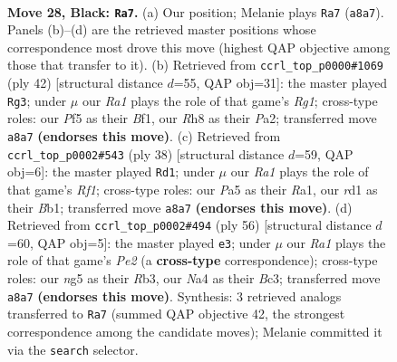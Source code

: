 \documentclass[11pt]{article}
\begin{document}
\begin{figure}[p]\centering
\begin{subfigure}{0.46\textwidth}\centering
\resizebox{\linewidth}{!}{%
\newchessgame
\chessboard[
  setfen={r1b4r/6k1/p1n1P1p1/p4pNp/n1B2B2/P5P1/1P3P1P/RK1R4 b - - 0 28},
  showmover=false,
  pgfstyle=straightmove, color=movearrow, markmove={a8-a7}
]}
\caption{}
\end{subfigure}\hfill
\begin{subfigure}{0.46\textwidth}\centering
\resizebox{\linewidth}{!}{%
\newchessgame
\chessboard[
  setfen={r3r1k1/1p1n1p1p/p1b3p1/8/2P2RP1/5P2/PPN4P/2K2BR1 w - - 1 22},
  showmover=false,
  pgfstyle=straightmove, color=movearrow, markmove={g1-g3}
]}
\caption{}
\end{subfigure}
\\[4pt]
\begin{subfigure}{0.46\textwidth}\centering
\resizebox{\linewidth}{!}{%
\newchessgame
\chessboard[
  setfen={r5k1/pbpp2pp/np2p3/7P/P1PP2r1/6N1/1P3PP1/RB3RK1 w - - 0 20},
  showmover=false,
  pgfstyle=straightmove, color=movearrow, markmove={f1-d1}
]}
\caption{}
\end{subfigure}\hfill
\begin{subfigure}{0.46\textwidth}\centering
\resizebox{\linewidth}{!}{%
\newchessgame
\chessboard[
  setfen={3r1bk1/5p2/pp2r1p1/2p4p/PnN5/1RB3P1/1P2PP1P/1R3K2 w - - 0 29},
  showmover=false,
  pgfstyle=straightmove, color=movearrow, markmove={e2-e3}
]}
\caption{}
\end{subfigure}
\caption{\textbf{Move 28, Black: \texttt{Ra7}.} (a) Our position; Melanie plays \texttt{Ra7} (\texttt{a8a7}). Panels (b)--(d) are the retrieved master positions whose correspondence most drove this move (highest QAP objective among those that transfer to it). (b) Retrieved from \texttt{ccrl\_top\_p0000\#1069} (ply 42) [structural distance $d$=55, QAP obj=31]: the master played \texttt{Rg3}; under $\mu$ our \emph{Ra1} plays the role of that game's \emph{Rg1}; cross-type roles: our \emph{P}f5 as their \emph{B}f1, our \emph{R}h8 as their \emph{P}a2; transferred move \texttt{a8a7} \textbf{(endorses this move)}. (c) Retrieved from \texttt{ccrl\_top\_p0002\#543} (ply 38) [structural distance $d$=59, QAP obj=6]: the master played \texttt{Rd1}; under $\mu$ our \emph{Ra1} plays the role of that game's \emph{Rf1}; cross-type roles: our \emph{P}a5 as their \emph{R}a1, our \emph{r}d1 as their \emph{B}b1; transferred move \texttt{a8a7} \textbf{(endorses this move)}. (d) Retrieved from \texttt{ccrl\_top\_p0002\#494} (ply 56) [structural distance $d$=60, QAP obj=5]: the master played \texttt{e3}; under $\mu$ our \emph{Ra1} plays the role of that game's \emph{Pe2} (a \textbf{cross-type} correspondence); cross-type roles: our \emph{n}g5 as their \emph{R}b3, our \emph{N}a4 as their \emph{B}c3; transferred move \texttt{a8a7} \textbf{(endorses this move)}. Synthesis: 3 retrieved analogs transferred to \texttt{Ra7} (summed QAP objective 42, the strongest correspondence among the candidate moves); Melanie committed it via the \texttt{search} selector.}
\label{fig:thought-m55}
\end{figure}
\end{document}

